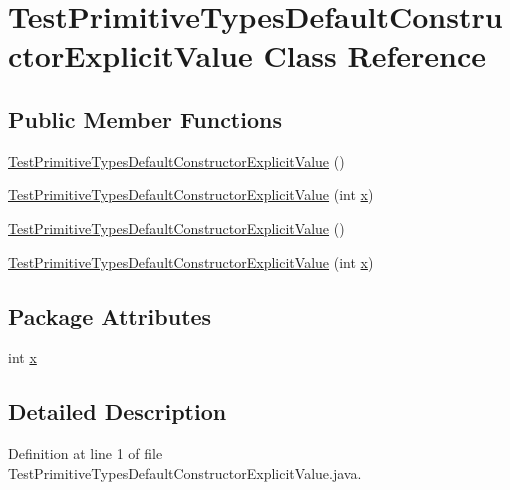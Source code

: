 \hypertarget{classTestPrimitiveTypesDefaultConstructorExplicitValue}{
\section{TestPrimitiveTypesDefaultConstructorExplicitValue Class Reference}
\label{classTestPrimitiveTypesDefaultConstructorExplicitValue}
}
\subsection*{Public Member Functions}
\begin{DoxyCompactItemize}
\item 
\hyperlink{classTestPrimitiveTypesDefaultConstructorExplicitValue_abe9e9a57ad718e323bca5ca2084ff21a}{TestPrimitiveTypesDefaultConstructorExplicitValue} ()
\item 
\hyperlink{classTestPrimitiveTypesDefaultConstructorExplicitValue_a8bc8457c6791b9ac82aee39874cd5ba5}{TestPrimitiveTypesDefaultConstructorExplicitValue} (int \hyperlink{classTestPrimitiveTypesDefaultConstructorExplicitValue_a03b0399474d7b238638597188620fb59}{x})
\item 
\hyperlink{classTestPrimitiveTypesDefaultConstructorExplicitValue_abe9e9a57ad718e323bca5ca2084ff21a}{TestPrimitiveTypesDefaultConstructorExplicitValue} ()
\item 
\hyperlink{classTestPrimitiveTypesDefaultConstructorExplicitValue_a8bc8457c6791b9ac82aee39874cd5ba5}{TestPrimitiveTypesDefaultConstructorExplicitValue} (int \hyperlink{classTestPrimitiveTypesDefaultConstructorExplicitValue_a03b0399474d7b238638597188620fb59}{x})
\end{DoxyCompactItemize}
\subsection*{Package Attributes}
\begin{DoxyCompactItemize}
\item 
int \hyperlink{classTestPrimitiveTypesDefaultConstructorExplicitValue_a03b0399474d7b238638597188620fb59}{x}
\end{DoxyCompactItemize}


\subsection{Detailed Description}


Definition at line 1 of file TestPrimitiveTypesDefaultConstructorExplicitValue.java.



